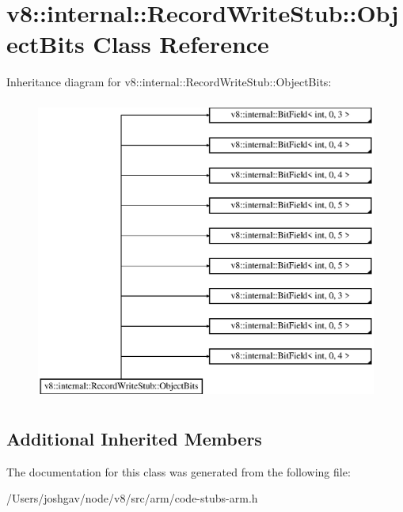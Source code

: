 \hypertarget{classv8_1_1internal_1_1_record_write_stub_1_1_object_bits}{}\section{v8\+:\+:internal\+:\+:Record\+Write\+Stub\+:\+:Object\+Bits Class Reference}
\label{classv8_1_1internal_1_1_record_write_stub_1_1_object_bits}
Inheritance diagram for v8\+:\+:internal\+:\+:Record\+Write\+Stub\+:\+:Object\+Bits\+:\begin{figure}[H]
\begin{center}
\leavevmode
\includegraphics[height=10.000000cm]{classv8_1_1internal_1_1_record_write_stub_1_1_object_bits}
\end{center}
\end{figure}
\subsection*{Additional Inherited Members}


The documentation for this class was generated from the following file\+:\begin{DoxyCompactItemize}
\item 
/\+Users/joshgav/node/v8/src/arm/code-\/stubs-\/arm.\+h\end{DoxyCompactItemize}

